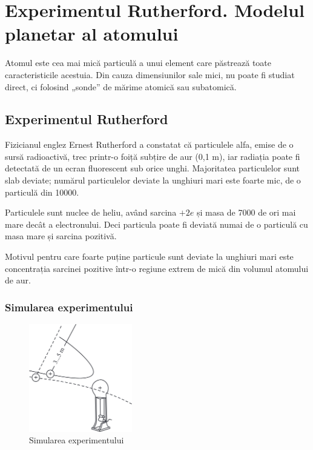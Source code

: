 \section{Experimentul Rutherford. Modelul planetar al atomului}

Atomul este cea mai mică particulă a unui element care păstrează toate
caracteristicile acestuia. Din cauza dimensiunilor sale mici, nu poate fi
studiat direct, ci folosind „sonde” de mărime atomică sau subatomică.

\subsection{Experimentul Rutherford}

Fizicianul englez Ernest Rutherford a constatat că particulele alfa, emise de o
sursă radioactivă, trec printr-o foiță subțire de aur (0,1 {\textmu}m), iar
radiația {\alpha} poate fi detectată de un ecran fluorescent sub orice unghi.
Majoritatea particulelor {\alpha} sunt slab deviate; numărul particulelor deviate la
unghiuri mari este foarte mic, de o particulă din 10000.

Particulele {\alpha} sunt nuclee de heliu, având sarcina $+2e$ și masa de 7000
de ori mai mare decât a electronului. Deci particula {\alpha} poate fi deviată
numai de o particulă cu masa mare și sarcina pozitivă.

Motivul pentru care foarte puține particule sunt deviate la unghiuri mari este
concentrația sarcinei pozitive într-o regiune extrem de mică din volumul
atomului de aur.

\subsubsection*{Simularea experimentului}

\begin{figure}
    \centering
    \includegraphics[width=0.4\textwidth]{fig/rutherford}
    \caption{Simularea experimentului}
\end{figure}

